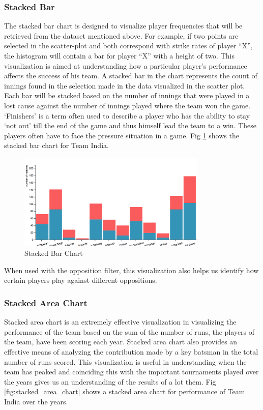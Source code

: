 \documentclass[10pt,journal,compsoc]{IEEEtran}
\begin{document}
\subsubsection {Stacked Bar}
The stacked bar chart is designed to visualize player frequencies that will be retrieved from the dataset mentioned above. For example, if two points are selected in the scatter-plot and both correspond with strike rates of player ``X'', the histogram will contain a bar for player ``X'' with a height of two. This visualization is aimed at understanding how a particular player's performance affects the success of his team. A stacked bar in the chart represents the count of innings found in the selection made in the data visualized in the scatter plot. Each bar will be stacked based on the number of innings that were played in a lost cause against the number of innings played where the team won the game.\\

\indent `Finishers' is a term often used to  describe  a player who has the ability to stay `not out' till the end of the game and thus himself lead the team to a win. These players often have to face the pressure situation in a game. Fig \ref{fig:stacked_bar_chart} shows the stacked bar chart for Team India.\\

\begin{figure}[ht]
\includegraphics[width=9cm]{stacked_bar_chart.png}
\caption{Stacked Bar Chart}
\label{fig:stacked_bar_chart}
\end{figure}

\indent When used with the opposition filter, this visualization also helps us identify how certain players play against different oppositions.

\subsubsection {Stacked Area Chart}
Stacked area chart is an extremely effective visualization in visualizing the performance of the team based on the sum of the number of runs, the players of the team, have been scoring each year. Stacked area chart also provides an effective means of analyzing the contribution made by a key batsman in the total number of runs scored. This visualization is useful in understanding when the team has peaked and coinciding this with the important tournaments played over the years gives us an understanding of the results of a lot them. Fig \ref{fig:stacked_area_chart} shows a stacked area chart for performance of Team India over the years.\\
\end{document}
